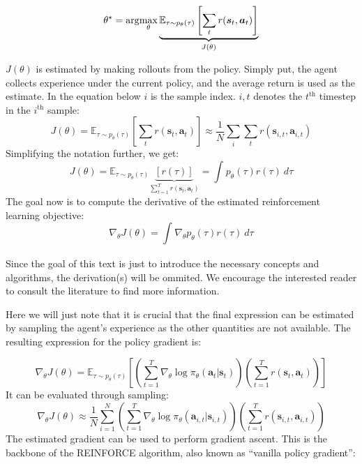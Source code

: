 \begin{equation}
		\theta^\star = \arg\!\max_\theta \underbrace{\mathbb{E}_{\tau \sim p_\theta (\tau)} \left [ \sum_t r(\bm{s}_t, \bm{a}_t) \right ]}_{J(\theta)}
\end{equation}

$J(\theta)$ is estimated by making rollouts from the policy.
Simply put, the agent collects experience under the current policy,
and the average return is used as the estimate.
In the equation below $i$ is the sample index. $i,t$ denotes the $t^{\text{th}}$ timestep
in the $i^{\text{th}}$ sample:
\begin{equation}
		J(\theta) = \mathbb{E}_{\tau \sim p_\theta(\tau)} \left [ \sum_t r(\bm{s}_t, \bm{a}_t) \right ] \approx 
		\frac{1}{N} \sum_i \sum_t r(\bm{s}_{i,t}, \bm{a}_{i,t})
\end{equation}
Simplifying the notation further, we get:
\begin{equation}
		J(\theta) = \mathbb{E}_{\tau \sim p_\theta(\tau)} \underbrace{[r(\tau)]}_{\sum^{T}_{t=1} r(\bm{s}_t, \bm{a}_t)} = 
		\int_{{}}^{} {p_\theta(\tau)r(\tau)} \: d{\tau} {}
\end{equation}
The goal now is to compute the derivative of the estimated reinforcement learning
objective:
\begin{equation}
		\label{eq:derivative-of-estimated-rl-obj}
		\nabla_\theta J(\theta) = \int_{{}}^{{}} {\nabla_\theta p_\theta (\tau) r(\tau)} \: d{\tau} {}
\end{equation}

Since the goal of this text is just to introduce the necessary concepts
and algorithms, the derivation(s) will be ommited.
We encourage the interested reader to consult the literature \cite{suttonrlbook, berkleylectures} 
to find more information.

Here we will just note that it is crucial that the final expression
can be estimated by sampling the agent's experience 
as the other quantities are not available.
The resulting expression for the policy gradient \label{eq:derivative-of-estimated-rl-obj} is:

\begin{equation}
		\label{eq:policy-gradient}
		\nabla_\theta J(\theta) = \mathbb{E}_{\tau \sim p_\theta(\tau)} 
		\left [ \left ( \sum_{t=1}^{T} \nabla_\theta \log \pi_\theta (\bm{a}_t | \bm{s}_t ) \right )
		\left ( \sum_{t=1}^{T} r(\bm{s}_t, \bm{a}_t) \right ) \right ]
\end{equation}
It can be evaluated through sampling:
\begin{equation}
		\label{eq:estimated-policy-gradient}
		\nabla_\theta J(\theta) \approx \frac{1}{N}  \sum_{i=1}^{N} 
		\left ( \sum_{t=1}^{T} \nabla_\theta \log \pi_\theta (\bm{a}_{i,t} | \bm{s}_{i,t} ) \right )
		\left ( \sum_{t=1}^{T} r(\bm{s}_{i,t}, \bm{a}_{i,t}) \right )
\end{equation}
The estimated gradient can be used to perform gradient ascent. 
This is the backbone of 
the REINFORCE algorithm, also known as ``vanilla policy gradient'':

